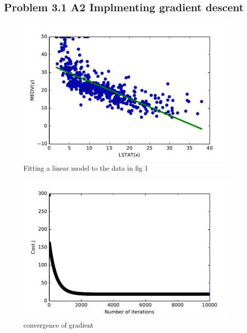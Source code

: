 \documentclass[pdftex,11pt]{article}
\begin{document}
\subsection{Problem 3.1 A2 Implmenting gradient descent}
\begin{figure}[H]
  \caption{Fitting a linear model to the data in fig 1}
  \centering
    \includegraphics[scale=1]{fig2.pdf}
\end{figure}
\begin{figure}[H]
  \caption{convergence of gradient }
  \centering
    \includegraphics[scale=1]{fig4.pdf}
\end{figure}
\end{document}
